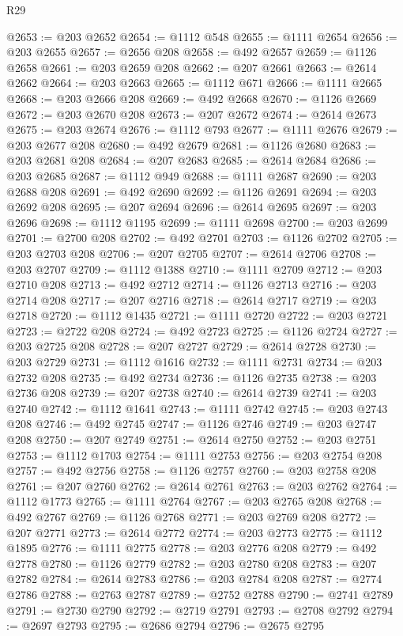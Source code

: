\begin{lexlean}{R29}
\begin{coremodule}
@2653 := @203 @2652
@2654 := @1112 @548
@2655 := @1111 @2654
@2656 := @203 @2655
@2657 := @2656 @208
@2658 := @492 @2657
@2659 := @1126 @2658
@2661 := @203 @2659 @208
@2662 := @207 @2661
@2663 := @2614 @2662
@2664 := @203 @2663
@2665 := @1112 @671
@2666 := @1111 @2665
@2668 := @203 @2666 @208
@2669 := @492 @2668
@2670 := @1126 @2669
@2672 := @203 @2670 @208
@2673 := @207 @2672
@2674 := @2614 @2673
@2675 := @203 @2674
@2676 := @1112 @793
@2677 := @1111 @2676
@2679 := @203 @2677 @208
@2680 := @492 @2679
@2681 := @1126 @2680
@2683 := @203 @2681 @208
@2684 := @207 @2683
@2685 := @2614 @2684
@2686 := @203 @2685
@2687 := @1112 @949
@2688 := @1111 @2687
@2690 := @203 @2688 @208
@2691 := @492 @2690
@2692 := @1126 @2691
@2694 := @203 @2692 @208
@2695 := @207 @2694
@2696 := @2614 @2695
@2697 := @203 @2696
@2698 := @1112 @1195
@2699 := @1111 @2698
@2700 := @203 @2699
@2701 := @2700 @208
@2702 := @492 @2701
@2703 := @1126 @2702
@2705 := @203 @2703 @208
@2706 := @207 @2705
@2707 := @2614 @2706
@2708 := @203 @2707
@2709 := @1112 @1388
@2710 := @1111 @2709
@2712 := @203 @2710 @208
@2713 := @492 @2712
@2714 := @1126 @2713
@2716 := @203 @2714 @208
@2717 := @207 @2716
@2718 := @2614 @2717
@2719 := @203 @2718
@2720 := @1112 @1435
@2721 := @1111 @2720
@2722 := @203 @2721
@2723 := @2722 @208
@2724 := @492 @2723
@2725 := @1126 @2724
@2727 := @203 @2725 @208
@2728 := @207 @2727
@2729 := @2614 @2728
@2730 := @203 @2729
@2731 := @1112 @1616
@2732 := @1111 @2731
@2734 := @203 @2732 @208
@2735 := @492 @2734
@2736 := @1126 @2735
@2738 := @203 @2736 @208
@2739 := @207 @2738
@2740 := @2614 @2739
@2741 := @203 @2740
@2742 := @1112 @1641
@2743 := @1111 @2742
@2745 := @203 @2743 @208
@2746 := @492 @2745
@2747 := @1126 @2746
@2749 := @203 @2747 @208
@2750 := @207 @2749
@2751 := @2614 @2750
@2752 := @203 @2751
@2753 := @1112 @1703
@2754 := @1111 @2753
@2756 := @203 @2754 @208
@2757 := @492 @2756
@2758 := @1126 @2757
@2760 := @203 @2758 @208
@2761 := @207 @2760
@2762 := @2614 @2761
@2763 := @203 @2762
@2764 := @1112 @1773
@2765 := @1111 @2764
@2767 := @203 @2765 @208
@2768 := @492 @2767
@2769 := @1126 @2768
@2771 := @203 @2769 @208
@2772 := @207 @2771
@2773 := @2614 @2772
@2774 := @203 @2773
@2775 := @1112 @1895
@2776 := @1111 @2775
@2778 := @203 @2776 @208
@2779 := @492 @2778
@2780 := @1126 @2779
@2782 := @203 @2780 @208
@2783 := @207 @2782
@2784 := @2614 @2783
@2786 := @203 @2784 @208
@2787 := @2774 @2786
@2788 := @2763 @2787
@2789 := @2752 @2788
@2790 := @2741 @2789
@2791 := @2730 @2790
@2792 := @2719 @2791
@2793 := @2708 @2792
@2794 := @2697 @2793
@2795 := @2686 @2794
@2796 := @2675 @2795

\end{coremodule}
\end{lexlean}
